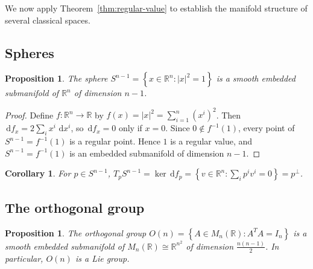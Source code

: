 \documentclass[12pt,a4paper,openany]{book}
\newtheorem{proposition}[theorem]{Proposition}
\newtheorem{corollary}[theorem]{Corollary}
\theoremstyle{definition}
\theoremstyle{remark}
\newcommand{\R}{\mathbb{R}}
\newcommand{\dd}{\,\mathrm{d}}
\newcommand{\abs}[1]{\left\lvert #1 \right\rvert}
\newcommand{\set}[1]{\left\{ #1 \right\}}
\begin{document}
We now apply Theorem~\ref{thm:regular-value} to establish the manifold
structure of several classical spaces.

\subsection{Spheres}\label{ssec:sphere}

\begin{proposition}\label{prop:sphere-submanifold}%
The sphere $S^{n-1} = \set{x \in \R^n : \abs{x}^2 = 1}$ is a smooth
embedded submanifold of\/ $\R^n$ of dimension $n - 1$.
\end{proposition}

\begin{proof}
Define $f \colon \R^n \to \R$ by $f(x) = \abs{x}^2 = \sum_{i=1}^n (x^i)^2$.
Then $\dd f_x = 2\sum_i x^i\, \dd x^i$, so $\dd f_x = 0$ only if $x = 0$.
Since $0 \notin f^{-1}(1)$, every point of $S^{n-1} = f^{-1}(1)$ is a
regular point.  Hence $1$ is a regular value, and
$S^{n-1} = f^{-1}(1)$ is an embedded submanifold of dimension
$n - 1$.
\end{proof}

\begin{corollary}\label{cor:tangent-sphere}
For $p \in S^{n-1}$, $T_pS^{n-1} = \ker \dd f_p = \set{v \in \R^n :
\sum_i p^i v^i = 0} = p^\perp$.
\end{corollary}

\subsection{The orthogonal group}\label{ssec:orthogonal}

\begin{proposition}\label{prop:On-submanifold}%
The orthogonal group $O(n) = \set{A \in M_n(\R) : A^T A = I_n}$ is a
smooth embedded submanifold of $M_n(\R) \cong \R^{n^2}$ of dimension
$\frac{n(n-1)}{2}$.  In particular, $O(n)$ is a Lie group.
\end{proposition}
\end{document}
